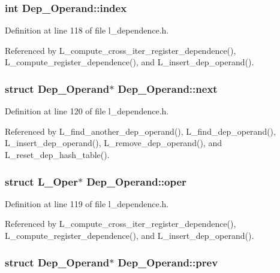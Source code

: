 \subsubsection{\setlength{\rightskip}{0pt plus 5cm}int \bf{Dep\_\-Operand::index}}\label{structDep__Operand_eec3b55f14e198feee174bdc922b3de5}




Definition at line 118 of file l\_\-dependence.h.

Referenced by L\_\-compute\_\-cross\_\-iter\_\-register\_\-dependence(), L\_\-compute\_\-register\_\-dependence(), and L\_\-insert\_\-dep\_\-operand().
\subsubsection{\setlength{\rightskip}{0pt plus 5cm}struct \bf{Dep\_\-Operand}$\ast$ \bf{Dep\_\-Operand::next}}\label{structDep__Operand_0843199a93b411ca4973e2cc43218717}




Definition at line 120 of file l\_\-dependence.h.

Referenced by L\_\-find\_\-another\_\-dep\_\-operand(), L\_\-find\_\-dep\_\-operand(), L\_\-insert\_\-dep\_\-operand(), L\_\-remove\_\-dep\_\-operand(), and L\_\-reset\_\-dep\_\-hash\_\-table().
\subsubsection{\setlength{\rightskip}{0pt plus 5cm}struct L\_\-Oper$\ast$ \bf{Dep\_\-Operand::oper}}\label{structDep__Operand_7c82d0d618743a813b5c55aed19fb654}




Definition at line 119 of file l\_\-dependence.h.

Referenced by L\_\-compute\_\-cross\_\-iter\_\-register\_\-dependence(), L\_\-compute\_\-register\_\-dependence(), and L\_\-insert\_\-dep\_\-operand().
\subsubsection{\setlength{\rightskip}{0pt plus 5cm}struct \bf{Dep\_\-Operand}$\ast$ \bf{Dep\_\-Operand::prev}}\label{structDep__Operand_42b52e93466cbba530835e21cb38c268}




